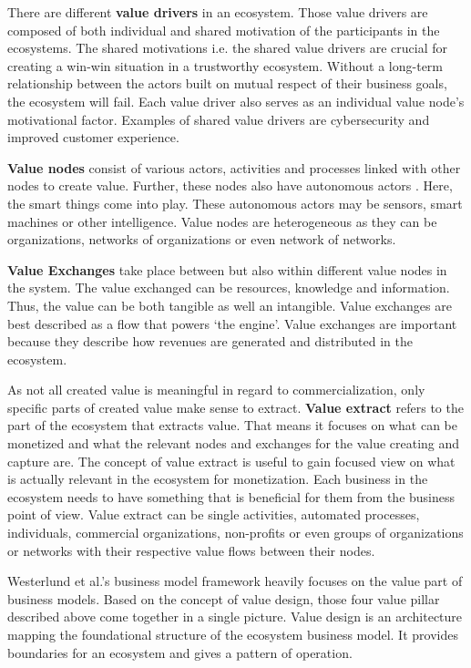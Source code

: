 		There are different \textbf{value drivers} in an ecosystem. Those value drivers are composed of both individual and shared motivation of the participants in the ecosystems. The shared motivations i.e. the shared value drivers are crucial for creating a win-win situation in a trustworthy ecosystem. Without a long-term relationship between the actors built on mutual respect of their business goals, the ecosystem will fail. Each value driver also serves as an individual value node's motivational factor. Examples of shared value drivers are cybersecurity and improved customer experience.

		\textbf{Value nodes} consist of various actors, activities and processes linked with other nodes to create value. Further, these nodes also have autonomous actors . Here, the smart things come into play. These autonomous actors may be sensors, smart machines or other intelligence. Value nodes are heterogeneous as they can be organizations, networks of organizations or even network of networks.

		\textbf{Value Exchanges} take place between but also within different value nodes in the system. The value exchanged can be resources, knowledge and information. Thus, the value can be both tangible as well an intangible. Value exchanges are best described as a flow that powers `the engine'. Value exchanges are important because they describe how revenues are generated and distributed in the ecosystem.

		As not all created value is meaningful in regard to commercialization, only specific parts of created value make sense to extract. \textbf{Value extract} refers to the part of the ecosystem that extracts value. That means it focuses on what can be monetized and what the relevant nodes and exchanges for the value creating and capture are. The concept of value extract is useful to gain focused view on what is actually relevant in the ecosystem for monetization. Each business in the ecosystem needs to have something that is beneficial for them from the business point of view. Value extract can be single activities, automated processes, individuals, commercial organizations, non-profits or even groups of organizations or networks with their respective value flows between their nodes.

		Westerlund et al.'s business model framework heavily focuses on the value part of business models. Based on the concept of value design, those four value pillar described above come together in a single picture. Value design is an architecture mapping the foundational structure of the ecosystem business model. It provides boundaries for an ecosystem and gives a pattern of operation.

